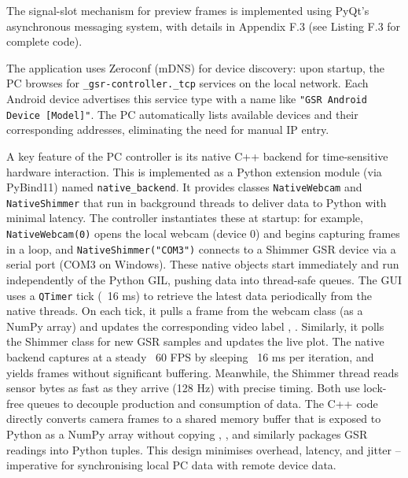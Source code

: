 The signal-slot mechanism for preview frames is implemented using PyQt's asynchronous messaging system, with details in Appendix F.3 (see Listing F.3 for complete code).

The application uses Zeroconf (mDNS) \cite{ref19} for device discovery: upon startup, the PC browses for \texttt{\_gsr-controller.\_tcp} services on the local network. Each Android device advertises this service type with a name like \texttt{"GSR Android Device [Model]"}. The PC automatically lists available devices and their corresponding addresses, eliminating the need for manual IP entry.

A key feature of the PC controller is its native C++ backend for time-sensitive hardware interaction. This is implemented as a Python extension module (via PyBind11) \cite{ref18} named \texttt{native\_backend}. It provides classes \texttt{NativeWebcam} and \texttt{NativeShimmer} that run in background threads to deliver data to Python with minimal latency. The controller instantiates these at startup: for example, \texttt{NativeWebcam(0)} opens the local webcam (device 0) and begins capturing frames in a loop, and \texttt{NativeShimmer("COM3")} connects to a Shimmer GSR device via a serial port (COM3 on Windows). These native objects start immediately and run independently of the Python GIL, pushing data into thread-safe queues. The GUI uses a \texttt{QTimer} tick (~16 ms) to retrieve the latest data periodically from the native threads. On each tick, it pulls a frame from the webcam class (as a NumPy array) and updates the corresponding video label \cite{ref1}, \cite{ref2}. Similarly, it polls the Shimmer class for new GSR samples and updates the live plot. The native backend captures at a steady ~60 FPS by sleeping ~16 ms per iteration, and yields frames without significant buffering. Meanwhile, the Shimmer thread reads sensor bytes as fast as they arrive (128 Hz) with precise timing. Both use lock-free queues to decouple production and consumption of data. The C++ code directly converts camera frames to a shared memory buffer that is exposed to Python as a NumPy array without copying \cite{ref1}, \cite{ref2}, and similarly packages GSR readings into Python tuples. This design minimises overhead, latency, and jitter -- imperative for synchronising local PC data with remote device data.


